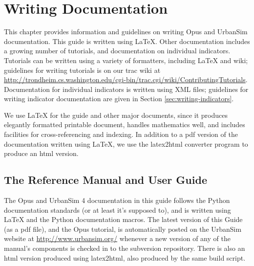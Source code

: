 
\chapter{Writing Documentation}

This chapter provides information and guidelines on writing Opus and
UrbanSim documentation.  This guide is written using \LaTeX{}.{}
Other documentation includes a growing number of tutorials, and
documentation on individual indicators.  Tutorials can be written using a
variety of formatters, including \LaTeX{} and wiki; guidelines for writing
tutorials is on our trac wiki at
\url{http://trondheim.cs.washington.edu/cgi-bin/trac.cgi/wiki/ContributingTutorials}.
Documentation for individual indicators is written using XML files;
guidelines for writing indicator documentation are given in Section
\ref{sec:writing-indicators}.

We use \LaTeX{} for the guide and other major documents,
since it produces elegantly formatted printable document, handles
mathematics well, and includes facilities for cross-referencing and
indexing.  In addition to a pdf version of the documentation written using
\LaTeX{}, we use the latex2html 
converter program to produce an html version.

\section{The Reference Manual and User Guide}

The Opus and UrbanSim 4 documentation in this guide follows the Python
documentation standards (or at least it's supposed to), and is
written using \LaTeX{} and the Python
documentation macros.  The latest version of this Guide (as a pdf file),
and the Opus tutorial, is automatically posted on the UrbanSim website at
\url{http://www.urbansim.org/} whenever a new version of any of the
manual's components is checked in to the subversion repository.  There is
also an html version produced using latex2html, also produced by the same
build script.

